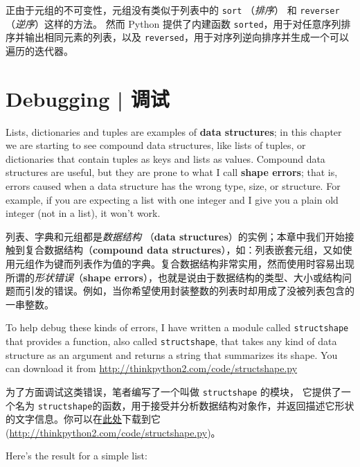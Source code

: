 正由于元组的不可变性，元组没有类似于列表中的 \lstinline{sort} （\emph{排序}） 和 \lstinline{reverser} （\emph{逆序}）这样的方法。  然而 Python 提供了内建函数 \lstinline{sorted}，用于对任意序列排序并输出相同元素的列表，以及 \lstinline {reversed}，用于对序列逆向排序并生成一个可以遍历的迭代器。

  
 


\section{Debugging  |  调试}
 
 

Lists, dictionaries and tuples are examples of {\bf data
  structures}; in this chapter we are starting to see compound data
structures, like lists of tuples, or dictionaries that contain tuples
as keys and lists as values.  Compound data structures are useful, but
they are prone to what I call {\bf shape errors}; that is, errors
caused when a data structure has the wrong type, size, or structure.
For example, if you are expecting a list with one integer and I
give you a plain old integer (not in a list), it won't work.

列表、字典和元组都是\emph{数据结构} （\textbf{data structures}）的实例；本章中我们开始接触到复合数据结构（\textbf{compound data structures}），如：列表嵌套元组，又如使用元组作为键而列表作为值的字典。复合数据结构非常实用，然而使用时容易出现所谓的\emph{形状错误}（\textbf{shape errors}），也就是说由于数据结构的类型、大小或结构问题而引发的错误。例如，当你希望使用封装整数的列表时却用成了没被列表包含的一串整数。
 

To help debug these kinds of errors, I have written a module
called {\tt structshape} that provides a function, also called
{\tt structshape}, that takes any kind of data structure as
an argument and returns a string that summarizes its shape.
You can download it from \url{http://thinkpython2.com/code/structshape.py}

为了方面调试这类错误，笔者编写了一个叫做 \lstinline{structshape} 的模块， 它提供了一个名为 \lstinline{structshape}的函数，用于接受并分析数据结构对象作，并返回描述它形状的文字信息。你可以在\href{http://thinkpython2.com/code/structshape.py}{此处}下载到它(\url{http://thinkpython2.com/code/structshape.py})。

Here's the result for a simple list:


